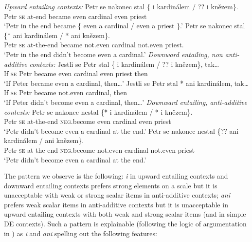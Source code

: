 \documentclass[output=paper,
]{langscibook}
\begin{document}
\ea\label{ex-44} \ea \textit{Upward entailing contexts:}
\ea \gll Petr se nakonec stal \{\hspace{-2pt} i kardinálem / ??\hspace{-2pt} i knězem\}.\\
Petr \textsc{se} at-end became {} even cardinal {} {} even priest\\
\glt `Petr in the end became \{ even a cardinal / even a priest \}.'
\ex \gll Petr se nakonec stal \{*\hspace{-2pt} ani kardinálem / *\hspace{-2pt} ani knězem\}.\\
Petr \textsc{se} at-the-end became  {} not.even  cardinal {} {} not.even priest.\\
\glt `Petr in the end didn't become even a cardinal.'
\z
\ex \textit{Downward entailing, non anti-additive contexts:}
\ea \gll Jestli se Petr stal \{\hspace{-2pt} i kardinálem / ??\hspace{-2pt} i knězem\}, tak\ldots\\
If \textsc{se} Petr became {} even cardinal {} {} even priest then\\
\glt `If Peter became even a cardinal, then\ldots'
\ex\gll  Jestli se Petr stal *\hspace{-2pt} ani kardinálem, tak\ldots\\
If \textsc{se} Petr became {} not.even cardinal, then\\
\glt `If Peter didn't become even a cardinal, then\ldots'
\z
\ex  \textit{Downward entailing, anti-additive contexts:}
\ea  \gll Petr se nakonec nestal \{*\hspace{-2pt} i kardinálem / *\hspace{-2pt} i knězem\}.\\
Petr \textsc{se} at-the-end \textsc{neg}.become  {} even cardinal {} {} even priest\\
\glt `Petr didn't become even a cardinal at the end.'
\ex  \gll Petr se nakonec nestal \{??\hspace{-2pt} ani kardinálem /\hspace{1.2cm} \hspace{-2pt} ani knězem\}.\\
Petr \textsc{se} at-the-end \textsc{neg}.become {} not.even cardinal {} {} not.even priest\\
\glt `Petr didn't become even a cardinal at the end.'
\z
\z
\z

\noindent The pattern we observe is the following: \textit{i} in upward entailing contexts and downward entailing contexts prefers strong elements on a scale but it is unacceptable with weak or strong scalar items in anti-additive contexts; \textit{ani} prefers weak scalar items in anti-additive contexts but it is unacceptable in upward entailing contexts with both weak and strong scalar items (and in simple DE contexts). Such a pattern is explainable (following the logic of argumentation in \citealt{crnic2011getting}) as \textit{i} and \textit{ani} spelling out the following features:
\end{document}
